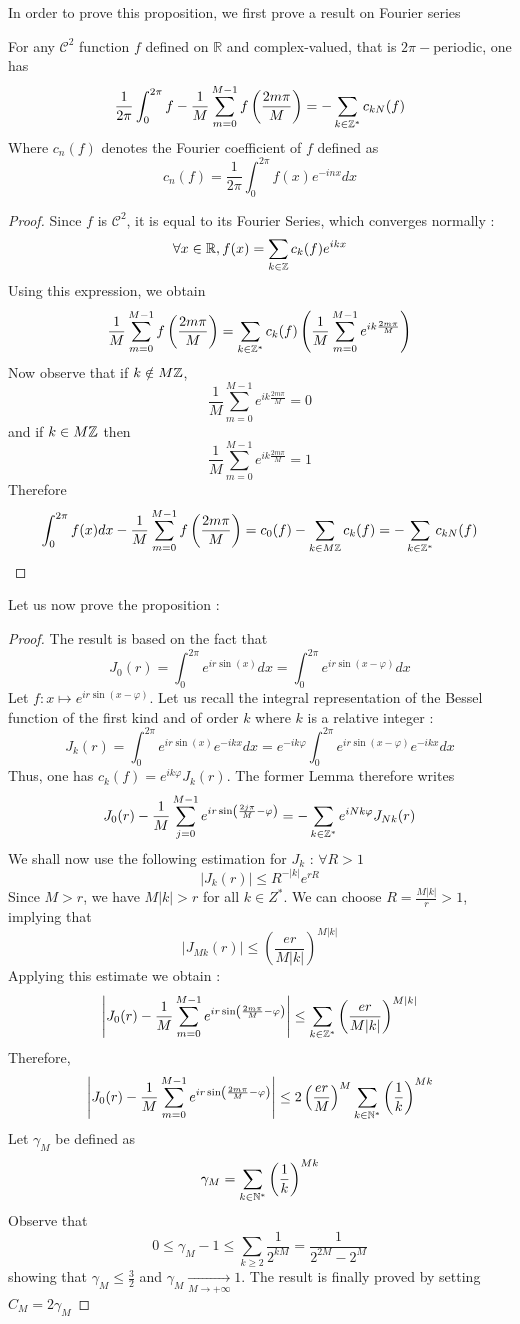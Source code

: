 \documentclass[11pt,a4paper]{article}
\begin{document}
In order to prove this proposition, we first prove a result on Fourier series
\begin{Lem} For any $\mathcal{C}^2$ function $f$ defined on $\mathbb{R}$ and complex-valued, that is $2\pi-$periodic, one has \[\dfrac{1}{2\pi}\int_{0}^{2\pi}f - \dfrac{1}{M}\sum_{m=0}^{M-1}f\left(\frac{2m\pi}{M} \right) = - \sum\limits_{k \in \mathbb{Z}^*}c_{kN}(f)\]
Where $c_n(f)$ denotes the Fourier coefficient of $f$ defined as \[c_n(f) = \dfrac{1}{2\pi}\int_{0}^{2\pi}f(x)e^{-inx}dx\]
\begin{proof}
Since $f$ is $\mathcal{C}^2$, it is equal to its Fourier Series, which converges normally : \[\forall x \in \mathbb{R}, f(x) = \sum_{k\in\mathbb{Z}} c_k(f)e^{ikx}\] Using this expression, we obtain \[\dfrac{1}{M}\sum_{m=0}^{M-1}f\left(\frac{2m\pi}{M}\right) = \sum\limits_{k\in \mathbb{Z}^*}c_k(f)\left(\frac{1}{M}\sum_{m=0}^{M-1}e^{ik\frac{2m\pi}{M}}\right)\] Now observe that if $k\notin M\mathbb{Z}$, \[\dfrac{1}{M}\sum_{m=0}^{M-1}e^{ik\frac{2m\pi}{M}} = 0\] and if $k\in M\mathbb{Z}$ then \[\dfrac{1}{M}\sum_{m=0}^{M-1}e^{ik\frac{2m\pi}{M}} = 1\] Therefore \[\int_{0}^{2\pi}f(x)dx - \dfrac{1}{M}\sum_{m=0}^{M-1}f\left(\frac{2m\pi}{M} \right) = c_0(f) - \sum\limits_{k \in M\mathbb{Z}}c_{k}(f) = - \sum\limits_{k \in \mathbb{Z}^*}c_{kN}(f)\]
\end{proof}
\end{Lem}

Let us now prove the proposition : 
\begin{proof}
The result is based on the fact that \[J_0(r) =  \int_0^{2\pi} e^{ir\sin(x)}dx = \int_0^{2\pi} e^{ir\sin(x - \varphi)}dx\] Let $f : x \mapsto e^{ir\sin(x - \varphi)}$. Let us recall the integral representation of the Bessel function of the first kind and of order $k$ where $k$ is a relative integer : \[J_k(r) =  \int_{0}^{2\pi}e^{ir\sin(x)}e^{-ikx}dx =  e^{-ik\varphi}\int_{0}^{2\pi}e^{ir\sin(x - \varphi)}e^{-ikx}dx\] Thus, one has $c_k(f) = e^{ik\varphi}J_k(r)$. The former Lemma therefore writes \[J_0(r) -  \dfrac{1}{M}\sum_{j=0}^{M-1}e^{ir\sin\left(\frac{2j\pi}{M}-\varphi\right)} = -\sum_{k\in \mathbb{Z}^*}e^{iNk\varphi}J_{Nk}(r)\] We shall now use the following estimation for $J_k$ : $\forall R>1$ \[|J_k(r)| \leq R^{-|k|}e^{rR}\] Since $M > r$, we have $M|k|>r$ for all $k \in Z^*$. We can choose $R = \frac{M|k|}{r} >1$, implying that \[|J_{Mk}(r)|\leq \left(\dfrac{er}{M|k|}\right)^{M|k|} \] Applying this estimate we obtain : \[\left|J_0(r) -  \dfrac{1}{M}\sum_{m=0}^{M-1}e^{ir\sin\left(\frac{2m\pi}{M}-\varphi\right)}\right| \leq \sum_{k\in \mathbb{Z}^*} \left(\dfrac{er}{M|k|}\right)^{M|k|}\] Therefore, \[\left|J_0(r) -  \dfrac{1}{M}\sum_{m=0}^{M-1}e^{ir\sin\left(\frac{2m\pi}{M}-\varphi\right)}\right| \leq 2\left(\dfrac{er}{M}\right)^{M}\sum_{k\in \mathbb{N}^*} \left(\dfrac{1}{k}\right)^{Mk}\]
Let $\gamma_M$ be defined as \[\gamma_M = \sum_{k\in \mathbb{N}^*} \left(\dfrac{1}{k}\right)^{Mk}\] Observe that \[0 \leq \gamma_M -1 \leq \sum_{k\geq 2} \dfrac{1}{2^{kM}} = \dfrac{1}{2^{2M} - 2^M}\] showing that $\gamma_M \leq \frac{3}{2}$ and $\gamma_M \underset{M\to +\infty}{\longrightarrow} 1$. The result is finally proved by setting $C_M = 2\gamma_M$ 

\end{proof}
\afterpage{\clearpage}
\end{document}
